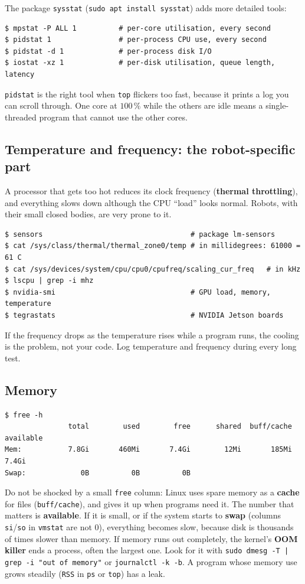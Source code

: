 The package \texttt{sysstat} (\verb|sudo apt install sysstat|) adds more detailed tools:
\begin{verbatim}
$ mpstat -P ALL 1          # per-core utilisation, every second
$ pidstat 1                # per-process CPU use, every second
$ pidstat -d 1             # per-process disk I/O
$ iostat -xz 1             # per-disk utilisation, queue length, latency
\end{verbatim}
\texttt{pidstat} is the right tool when \texttt{top} flickers too fast, because it prints a log you can scroll through. One core at $100\,\%$ while the others are idle means a single-threaded program that cannot use the other cores.

\subsection*{Temperature and frequency: the robot-specific part}
A processor that gets too hot reduces its clock frequency (\textbf{thermal throttling}), and everything slows down although the CPU ``load'' looks normal. Robots, with their small closed bodies, are very prone to it.
\begin{verbatim}
$ sensors                                   # package lm-sensors
$ cat /sys/class/thermal/thermal_zone0/temp # in millidegrees: 61000 = 61 C
$ cat /sys/devices/system/cpu/cpu0/cpufreq/scaling_cur_freq   # in kHz
$ lscpu | grep -i mhz
$ nvidia-smi                                # GPU load, memory, temperature
$ tegrastats                                # NVIDIA Jetson boards
\end{verbatim}
If the frequency drops as the temperature rises while a program runs, the cooling is the problem, not your code. Log temperature and frequency during every long test.

\subsection*{Memory}
\begin{verbatim}
$ free -h
               total        used        free      shared  buff/cache   available
Mem:           7.8Gi       460Mi       7.4Gi        12Mi       185Mi       7.4Gi
Swap:             0B          0B          0B
\end{verbatim}
Do not be shocked by a small \texttt{free} column: Linux uses spare memory as a \textbf{cache} for files (\texttt{buff/cache}), and gives it up when programs need it. The number that matters is \textbf{available}. If it is small, or if the system starts to \textbf{swap} (columns \texttt{si}/\texttt{so} in \texttt{vmstat} are not $0$), everything becomes slow, because disk is thousands of times slower than memory. If memory runs out completely, the kernel's \textbf{OOM killer} ends a process, often the largest one. Look for it with \verb!sudo dmesg -T | grep -i "out of memory"! or \verb|journalctl -k -b|. A program whose memory use grows steadily (\texttt{RSS} in \texttt{ps} or \texttt{top}) has a leak.

